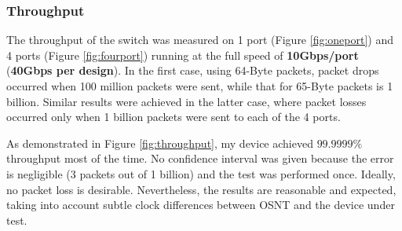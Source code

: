 \subsubsection{Throughput}
The throughput of the switch was measured on 1 port (Figure \ref{fig:oneport}) and 4 ports (Figure \ref{fig:fourport}) running at the full speed of \textbf{10Gbps/port} (\textbf{40Gbps per design}). In the first case, using 64-Byte packets, packet drops occurred when 100 million packets were sent, while that for 65-Byte packets is 1 billion. Similar results were achieved in the latter case, where packet losses occurred only when 1 billion packets were sent to each of the 4 ports.

As demonstrated in Figure \ref{fig:throughput}, my device achieved $99.9999\%$ throughput most of the time. No confidence interval was given because the error is negligible (3 packets out of 1 billion) and the test was performed once. Ideally, no packet loss is desirable. Nevertheless, the results are reasonable and expected, taking into account subtle clock differences between OSNT and the device under test.

